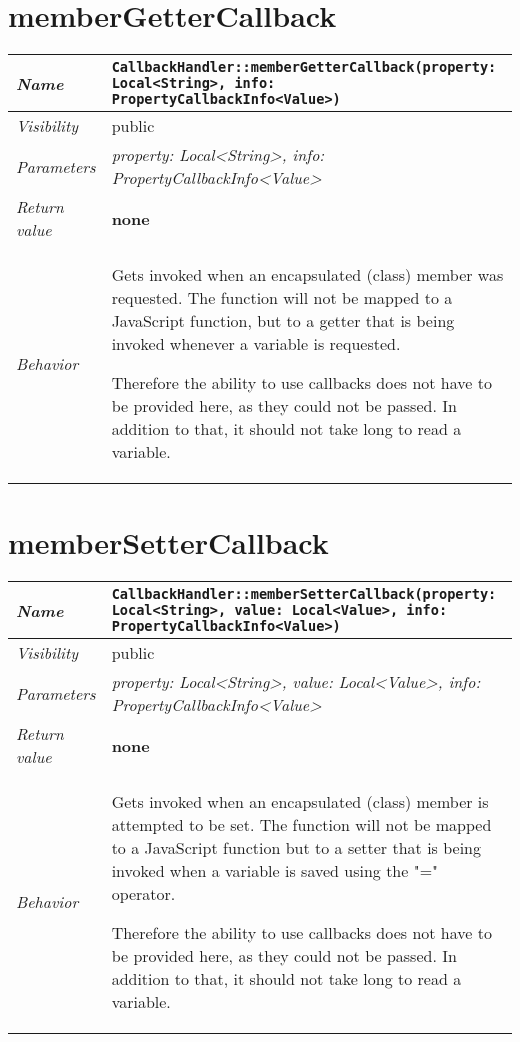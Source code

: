 \section{memberGetterCallback}
\begin{longtable}{p{3cm} @{\hskip 1cm} p{12cm}}
 \hline
\textit{Name} & \texttt{CallbackHandler::memberGetterCallback(property: Local<String>, info: PropertyCallbackInfo<Value>)}\\
\hline
 \textit{Visibility} & public\\
\hline
\textit{Parameters} & \textit{property: Local<String>, info: PropertyCallbackInfo<Value>}\\
\hline
\textit{Return value} & \textbf{none}\\
  \hline
 \textit{Behavior} & Gets invoked when an encapsulated (class) member was requested. The function will not be mapped to a JavaScript function, but to a getter that is being invoked whenever a variable is requested.

 Therefore the ability to use callbacks does not have to be provided here, as they could not be passed. In addition to that, it should not take long to read a variable. \\
\hline
\end{longtable}
 \section{memberSetterCallback}
\begin{longtable}{p{3cm} @{\hskip 1cm} p{12cm}}
 \hline
\textit{Name} & \texttt{CallbackHandler::memberSetterCallback(property: Local<String>, value: Local<Value>, info: PropertyCallbackInfo<Value>)}\\
\hline
 \textit{Visibility} & public\\
\hline
\textit{Parameters} & \textit{property: Local<String>, value: Local<Value>, info: PropertyCallbackInfo<Value>}\\
\hline
\textit{Return value} & \textbf{none}\\
  \hline
 \textit{Behavior} & Gets invoked when an encapsulated (class) member is attempted to be set. The function will not be mapped to a JavaScript function but to a setter that is being invoked when a variable is saved using the "=" operator.

  Therefore the ability to use callbacks does not have to be provided here, as they could not be passed. In addition to that, it should not take long to read a variable. \\
\hline
\end{longtable}
